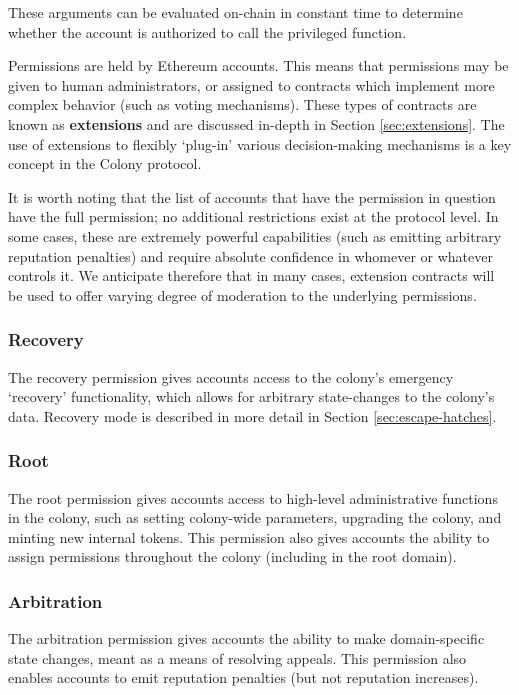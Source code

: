 These arguments can be evaluated on-chain in constant time to determine whether the account is authorized to call the privileged function.

Permissions are held by Ethereum accounts. This means that permissions may be given to human administrators, or assigned to contracts which implement more complex behavior (such as voting mechanisms). These types of contracts are known as \textbf{extensions} and are discussed in-depth in Section \ref{sec:extensions}. The use of extensions to flexibly `plug-in' various decision-making mechanisms is a key concept in the Colony protocol.

It is worth noting that the list of accounts that have the permission in question have the full permission; no additional restrictions exist at the protocol level. In some cases, these are extremely powerful capabilities (such as emitting arbitrary reputation penalties) and require absolute confidence in whomever or whatever controls it. We anticipate therefore that in many cases, extension contracts will be used to offer varying degree of moderation to the underlying permissions.

\subsubsection*{Recovery}

The recovery permission gives accounts access to the colony's emergency `recovery' functionality, which allows for arbitrary state-changes to the colony's data. Recovery mode is described in more detail in Section \ref{sec:escape-hatches}.

\subsubsection*{Root}

The root permission gives accounts access to high-level administrative functions in the colony, such as setting colony-wide parameters, upgrading the colony, and minting new internal tokens. This permission also gives accounts the ability to assign permissions throughout the colony (including in the root domain).

\subsubsection*{Arbitration}

The arbitration permission gives accounts the ability to make domain-specific state changes, meant as a means of resolving appeals. This permission also enables accounts to emit reputation penalties (but not reputation increases).

